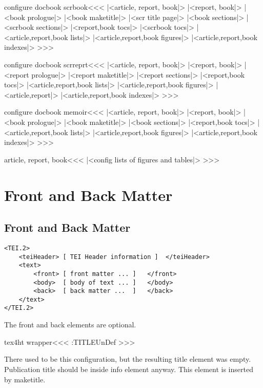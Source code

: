 \<configure docbook scrbook\><<< 
|<article, report, book|>
|<report, book|>
|<book prologue|>
|<book maketitle|>
|<scr title page|>
|<book sections|>
|<scrbook sections|>
|<report,book tocs|>
|<scrbook tocs|>
|<article,report,book lists|>
|<article,report,book figures|>
|<article,report,book indexes|>
>>>

\<configure docbook scrreprt\><<< 
|<article, report, book|>
|<report, book|>
|<report prologue|>
|<report maketitle|>
|<report sections|>
|<report,book tocs|>
|<article,report,book lists|>
|<article,report,book figures|>
|<article,report|>
|<article,report,book indexes|>
>>>

\<configure docbook memoir\><<< 
|<article, report, book|>
|<report, book|>
|<book prologue|>
|<book maketitle|>
|<book sections|>
|<report,book tocs|>
|<article,report,book lists|>
|<article,report,book figures|>
|<article,report,book indexes|>
>>>

\<article, report, book\><<<
|<config lists of figures and tables|>
>>>

\chapter{Front and Back Matter}



\section{Front and Back Matter}



\begin{verbatim}
<TEI.2>
    <teiHeader> [ TEI Header information ]  </teiHeader>
    <text>
        <front> [ front matter ... ]   </front>
        <body>  [ body of text ... ]   </body>
        <back>  [ back matter ...  ]   </back>
    </text>
</TEI.2>
\end{verbatim}

The front and back elements are optional.

\<tex4ht wrapper\><<<
 {}
\ifx \a:TITLE\:UnDef
\fi
>>>

There used to be this configuration, but the resulting title element was empty.
Publication title should be inside info element anyway. This element is inserted by maketitle.








